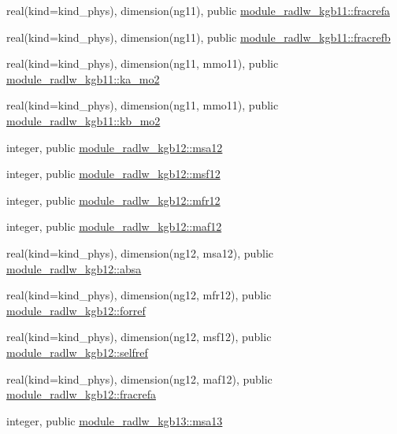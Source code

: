 \begin{DoxyCompactItemize}
\item 
real(kind=kind\+\_\+phys), dimension(ng11), public \hyperlink{namespacemodule__radlw__kgb11_a5bf6552fb9c1e7c35729b2aea885306e}{module\+\_\+radlw\+\_\+kgb11\+::fracrefa}
\item 
real(kind=kind\+\_\+phys), dimension(ng11), public \hyperlink{namespacemodule__radlw__kgb11_a0a89a2686ebc70a2c0d8577b89384a56}{module\+\_\+radlw\+\_\+kgb11\+::fracrefb}
\item 
real(kind=kind\+\_\+phys), dimension(ng11, mmo11), public \hyperlink{namespacemodule__radlw__kgb11_a8791eb290525c0d08fefa33ca23569c8}{module\+\_\+radlw\+\_\+kgb11\+::ka\+\_\+mo2}
\item 
real(kind=kind\+\_\+phys), dimension(ng11, mmo11), public \hyperlink{namespacemodule__radlw__kgb11_aebc48e152bb90794b6d0b426f6c5f9e4}{module\+\_\+radlw\+\_\+kgb11\+::kb\+\_\+mo2}
\item 
integer, public \hyperlink{namespacemodule__radlw__kgb12_ad1ddd94fe11b11485502d1fe6f5a1615}{module\+\_\+radlw\+\_\+kgb12\+::msa12}
\item 
integer, public \hyperlink{namespacemodule__radlw__kgb12_a3282a15ee0faaafd65509536a59e5b4f}{module\+\_\+radlw\+\_\+kgb12\+::msf12}
\item 
integer, public \hyperlink{namespacemodule__radlw__kgb12_acd751a2e48d0286e3d25a9b658a8367a}{module\+\_\+radlw\+\_\+kgb12\+::mfr12}
\item 
integer, public \hyperlink{namespacemodule__radlw__kgb12_a9d7c05182e21605108bd65f47bb5569c}{module\+\_\+radlw\+\_\+kgb12\+::maf12}
\item 
real(kind=kind\+\_\+phys), dimension(ng12, msa12), public \hyperlink{namespacemodule__radlw__kgb12_a7600bfa19dde3b47d8479f5766ee0c93}{module\+\_\+radlw\+\_\+kgb12\+::absa}
\item 
real(kind=kind\+\_\+phys), dimension(ng12, mfr12), public \hyperlink{namespacemodule__radlw__kgb12_a97dac0d0e010441171e09e317e5aeee8}{module\+\_\+radlw\+\_\+kgb12\+::forref}
\item 
real(kind=kind\+\_\+phys), dimension(ng12, msf12), public \hyperlink{namespacemodule__radlw__kgb12_a8aaf83ec7a08a244fd1e5396c9fd9b1d}{module\+\_\+radlw\+\_\+kgb12\+::selfref}
\item 
real(kind=kind\+\_\+phys), dimension(ng12, maf12), public \hyperlink{namespacemodule__radlw__kgb12_a58ff4f54c11eb12f7ab5157823981b16}{module\+\_\+radlw\+\_\+kgb12\+::fracrefa}
\item 
integer, public \hyperlink{namespacemodule__radlw__kgb13_a07932a22e5f8de248765a207e170ce6f}{module\+\_\+radlw\+\_\+kgb13\+::msa13}

\end{DoxyCompactItemize}
